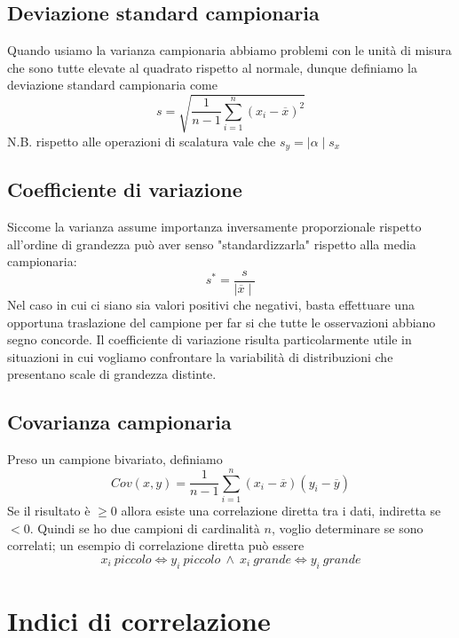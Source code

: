 \documentclass[11pt]{report}
\begin{document}
\subsection{Deviazione standard campionaria}
Quando usiamo la varianza campionaria abbiamo problemi con le unità di misura che sono tutte elevate al quadrato rispetto al normale, dunque definiamo la deviazione standard campionaria come
\begin{equation}
    s = \sqrt{\frac{1}{n-1}\sum_{i=1}^{n}(x_i - \overline{x})^2}
\end{equation}
N.B. rispetto alle operazioni di scalatura vale che $ s_y=\mid \alpha \mid s_x$
\subsection{Coefficiente di variazione}
Siccome la varianza assume importanza inversamente proporzionale rispetto all'ordine di grandezza può aver senso "standardizzarla" rispetto alla media campionaria:
\begin{equation}
    s^* = \frac{s}{\mid \overline{x} \mid}
\end{equation}
Nel caso in cui ci siano sia valori positivi che negativi, basta effettuare una opportuna traslazione del campione per far si che tutte le osservazioni abbiano segno concorde. Il coefficiente di variazione risulta particolarmente utile in situazioni in cui vogliamo confrontare la variabilità di distribuzioni che presentano scale di grandezza distinte.
\subsection{Covarianza campionaria}
Preso un campione bivariato, definiamo
\begin{equation}
    Cov(x,y) = \frac{1}{n-1}\sum_{i=1}^{n}(x_i - \overline{x})(y_i - \overline{y})
\end{equation}
Se il risultato è $\geq 0$ allora esiste una correlazione diretta tra i dati, indiretta se $<0$. Quindi se ho due campioni di cardinalità $n$, voglio determinare se sono correlati; un esempio di correlazione diretta può essere
$$x_i\ piccolo \iff y_i\ piccolo\ \land\ x_i\ grande \iff y_i\ grande$$

\section{Indici di correlazione}
\end{document}
